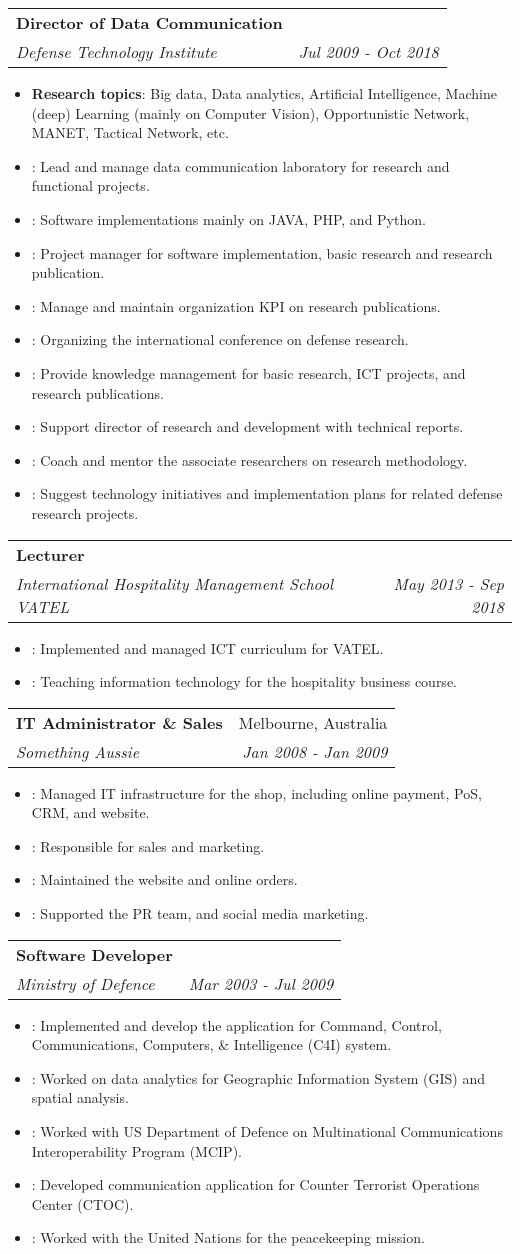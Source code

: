 \documentclass[letterpaper,11pt]{article}
\makeatletter
\newcommand{\resumeItem}[2]{
  \item\small{
    \textbf{#1}{: #2 \vspace{-2pt}}
  }
}
\newcommand{\resumeSubheading}[4]{
  \vspace{-1pt}\item
    \begin{tabular*}{0.97\textwidth}[t]{l@{\extracolsep{\fill}}r}
      \textbf{#1} & #2 \\
      \textit{\small#3} & \textit{\small #4} \\
    \end{tabular*}\vspace{-5pt}
}
\newcommand{\resumeItemListStart}{\begin{itemize}}
\newcommand{\resumeItemListEnd}{\end{itemize}\vspace{-5pt}}
\makeatother
\begin{document}
    \resumeSubheading
      {Director of Data Communication}{}
      {Defense Technology Institute}{Jul 2009 - Oct 2018}
      \resumeItemListStart
        \resumeItem{Research topics}
          {Big data, Data analytics, Artificial Intelligence, Machine (deep) Learning (mainly on Computer Vision), Opportunistic Network, MANET, Tactical Network, etc.}
        \resumeItem{}
          {Lead and manage data communication laboratory for research and functional projects.}
        \resumeItem{}
          {Software implementations mainly on JAVA, PHP, and Python.}
        \resumeItem{}
          {Project manager for software implementation, basic research and research publication.}
        \resumeItem{}
          {Manage and maintain organization KPI on research publications.}
        \resumeItem{}
          {Organizing the international conference on defense research.}
        \resumeItem{}
          {Provide knowledge management for basic research, ICT projects, and research publications.}
        \resumeItem{}
          {Support director of research and development with technical reports.}
        \resumeItem{}
          {Coach and mentor the associate researchers on research methodology.}
        \resumeItem{}
          {Suggest technology initiatives and implementation plans for related defense research projects.}
      \resumeItemListEnd

    \resumeSubheading
      {Lecturer}{}
      {International Hospitality Management School VATEL}{May 2013 - Sep 2018}
      \resumeItemListStart
        \resumeItem{}
          {Implemented and managed ICT curriculum for VATEL.}
        \resumeItem{}
          {Teaching information technology for the hospitality business course.}
      \resumeItemListEnd

      \resumeSubheading
      {IT Administrator \& Sales}{Melbourne, Australia}
      {Something Aussie}{Jan 2008 - Jan 2009}
      \resumeItemListStart
        \resumeItem{}
          {Managed IT infrastructure for the shop, including online payment, PoS, CRM, and website.}
        \resumeItem{}
          {Responsible for sales and marketing.}
        \resumeItem{}
          {Maintained the website and online orders.}
        \resumeItem{}
          {Supported the PR team, and social media marketing.}
      \resumeItemListEnd

    \resumeSubheading
      {Software Developer}{}
      {Ministry of Defence}{Mar 2003 - Jul 2009}
      \resumeItemListStart
        \resumeItem{}
          {Implemented and develop the application for Command, Control, Communications, Computers, \& Intelligence (C4I) system.}
        \resumeItem{}
          {Worked on data analytics for Geographic Information System (GIS) and spatial analysis.}
        \resumeItem{}
          {Worked with US Department of Defence on Multinational Communications Interoperability Program (MCIP).}
        \resumeItem{}
          {Developed communication application for Counter Terrorist Operations Center (CTOC).}
        \resumeItem{}
          {Worked with the United Nations for the peacekeeping mission.}
      \resumeItemListEnd
\end{document}
